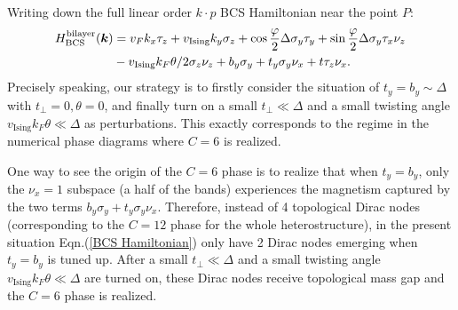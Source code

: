 \begin{subappendices}
	Writing down the full linear order $k \cdot p$ BCS Hamiltonian near the point $P$:
	\begin{align}
		H_{\text{BCS}}^{\text{bilayer}}(\bm{k}) & =v_F k_x\tau_z+v_{\text{Ising}} k_y\sigma_z+\cos\frac{\varphi}{2} \Delta \sigma_y\tau_y+\sin\frac{\varphi}{2}\Delta\sigma_y\tau_x\nu_z\notag \\
		                                        & -v_{\text{Ising}} k_F\theta/2 \sigma_z\nu_z+b_y\sigma_y+t_y\sigma_y\nu_x+t\tau_z\nu_x.\label{BCS Hamiltonian}
	\end{align}
	Precisely speaking, our strategy is to firstly consider the situation of $t_y=b_y\sim \Delta$ with $t_\perp=0,\theta=0$, and finally turn on a small $t_\perp\ll\Delta$ and a small twisting angle $v_{\text{Ising}}k_F\theta\ll \Delta$ as perturbations. This exactly corresponds to the regime in the numerical phase diagrams where $C=6$ is realized.

	One way to see the origin of the $C=6$ phase is to realize that when $t_y=b_y$, only the $\nu_x=1$ subspace (a half of the bands) experiences the magnetism captured by the two terms $b_y\sigma_y+t_y\sigma_y\nu_x$. Therefore, instead of 4 topological Dirac nodes (corresponding to the $C=12$ phase for the whole heterostructure), in the present situation Eqn.(\ref{BCS Hamiltonian}) only have 2 Dirac nodes emerging when $t_y=b_y$ is tuned up. After a small $t_\perp\ll\Delta$ and a small twisting angle $v_{\text{Ising}}k_F\theta\ll \Delta$ are turned on, these Dirac nodes receive topological mass gap and the $C=6$ phase is realized.



\end{subappendices}
